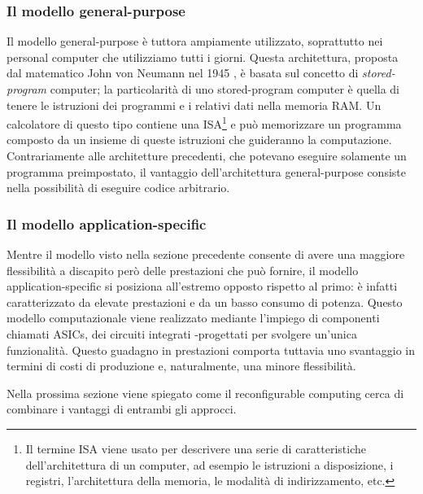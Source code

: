 \subsubsection{Il modello general-purpose}
Il modello general-purpose è tuttora ampiamente utilizzato, soprattutto nei personal
computer che utilizziamo tutti i giorni. Questa architettura, proposta dal matematico
John von Neumann nel 1945 \cite{First-Draft-Report-EDVAC}, è basata sul concetto di
\emph{stored-program} computer; la particolarità di uno stored-program computer è quella
di tenere le istruzioni dei programmi e i relativi dati nella memoria RAM. Un calcolatore di
questo tipo contiene una \ac{ISA}\footnote{Il termine \acl{ISA} viene usato per descrivere
una serie di caratteristiche dell'architettura di un computer, ad esempio le istruzioni
a disposizione, i registri, l'architettura della memoria, le modalità di indirizzamento, etc.}
e può memorizzare un programma composto da un insieme di queste istruzioni che guideranno
la computazione. Contrariamente alle architetture precedenti, che potevano eseguire
solamente un programma preimpostato, il vantaggio dell'architettura general-purpose consiste
nella possibilità di eseguire codice arbitrario.

\subsubsection{Il modello application-specific}
Mentre il modello visto nella sezione precedente consente di avere una maggiore
flessibilità a discapito però delle prestazioni che può fornire, il modello
application-specific si posiziona all'estremo opposto rispetto al primo: è infatti
caratterizzato da elevate prestazioni e da un basso consumo di potenza. Questo modello
computazionale viene realizzato mediante l'impiego di componenti chiamati \acp{ASIC},
dei circuiti integrati -progettati per svolgere un'unica funzionalità. Questo guadagno
in prestazioni comporta tuttavia uno svantaggio in termini di costi di produzione e,
naturalmente, una minore flessibilità.

Nella prossima sezione viene spiegato come il reconfigurable computing cerca di combinare
i vantaggi di entrambi gli approcci.

